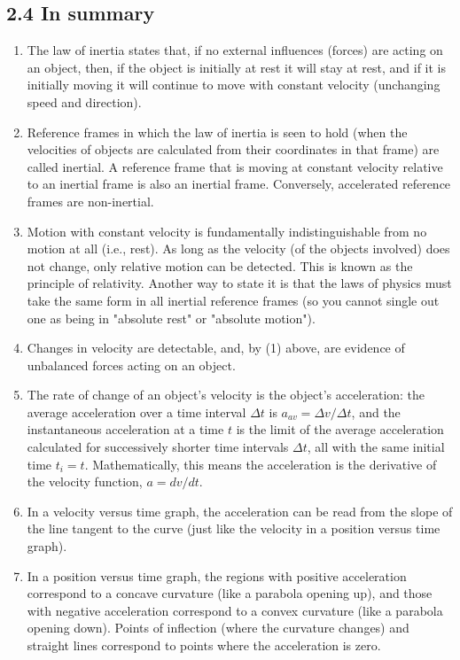\documentclass[10pt]{article}
\begin{document}
\subsection*{2.4 In summary}
\begin{enumerate}
  \item The law of inertia states that, if no external influences (forces) are acting on an object, then, if the object is initially at rest it will stay at rest, and if it is initially moving it will continue to move with constant velocity (unchanging speed and direction).
  \item Reference frames in which the law of inertia is seen to hold (when the velocities of objects are calculated from their coordinates in that frame) are called inertial. A reference frame that is moving at constant velocity relative to an inertial frame is also an inertial frame. Conversely, accelerated reference frames are non-inertial.
  \item Motion with constant velocity is fundamentally indistinguishable from no motion at all (i.e., rest). As long as the velocity (of the objects involved) does not change, only relative motion can be detected. This is known as the principle of relativity. Another way to state it is that the laws of physics must take the same form in all inertial reference frames (so you cannot single out one as being in "absolute rest" or "absolute motion").
  \item Changes in velocity are detectable, and, by (1) above, are evidence of unbalanced forces acting on an object.
  \item The rate of change of an object's velocity is the object's acceleration: the average acceleration over a time interval $\Delta t$ is $a_{a v}=\Delta v / \Delta t$, and the instantaneous acceleration at a time $t$ is the limit of the average acceleration calculated for successively shorter time intervals $\Delta t$, all with the same initial time $t_{i}=t$. Mathematically, this means the acceleration is the derivative of the velocity function, $a=d v / d t$.
  \item In a velocity versus time graph, the acceleration can be read from the slope of the line tangent to the curve (just like the velocity in a position versus time graph).
  \item In a position versus time graph, the regions with positive acceleration correspond to a concave curvature (like a parabola opening up), and those with negative acceleration correspond to a convex curvature (like a parabola opening down). Points of inflection (where the curvature changes) and straight lines correspond to points where the acceleration is zero.

\end{enumerate}
\end{document}
